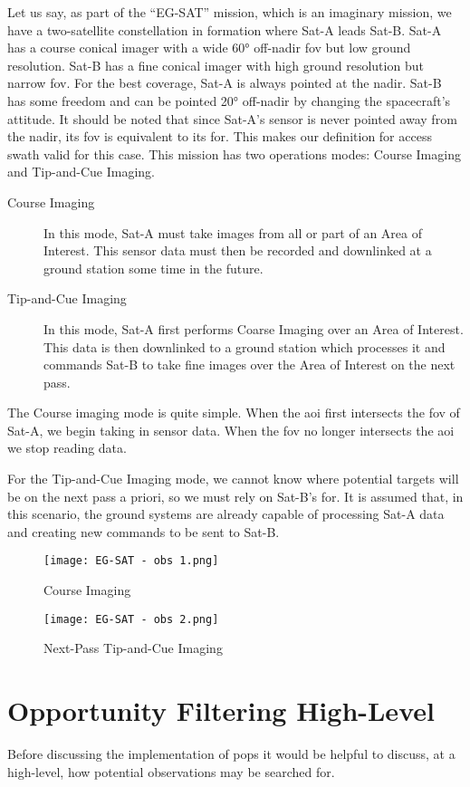 Let us say, as part of the “EG-SAT” mission, which is an imaginary mission, we
have a two-satellite constellation in formation where Sat-A leads Sat-B. Sat-A
has a course conical imager with a wide 60° off-nadir \gls{fov} but low ground
resolution.  Sat-B has a fine conical imager with high ground resolution but
narrow \gls{fov}.  For the best coverage, Sat-A is always pointed at the nadir.
Sat-B has some freedom and can be pointed 20° off-nadir by changing the
spacecraft’s attitude.  It should be noted that since Sat-A’s sensor is never
pointed away from the nadir, its \gls{fov} is equivalent to its \gls{for}. This
makes our definition for access swath valid for this case. This mission has two
operations modes: Course Imaging and Tip-and-Cue Imaging.

\begin{description} 

    \item[Course Imaging] In this mode, Sat-A must take images from all or part
	of an Area of Interest. This sensor data must then be recorded and
	downlinked at a ground station some time in the future.

    \item[Tip-and-Cue Imaging] In this mode, Sat-A first performs Coarse
	Imaging over an Area of Interest. This data is then downlinked to a
	ground station which processes it and commands Sat-B to take fine
	images over the Area of Interest on the next pass.

\end{description}

The Course imaging mode is quite simple. When the \gls{aoi} first intersects
the \gls{fov} of Sat-A, we begin taking in sensor data. When the \gls{fov} no
longer intersects the \gls{aoi} we stop reading data.

For the Tip-and-Cue Imaging mode, we cannot know where potential targets will
be on the next pass a priori, so we must rely on Sat-B's \gls{for}. It is
assumed that, in this scenario, the ground systems are already capable of
processing Sat-A data and creating new commands to be sent to Sat-B. 


\begin{figure} 
    \centering
    \begin{minipage}[c]{0.45\textwidth}
	\centering
	\texttt{[image: EG-SAT - obs 1.png]} 
	\caption{Course Imaging}
	\label{fig:eg-sat-2} 
    \end{minipage}
    \hfill
    \begin{minipage}[c]{0.45\textwidth}
	\centering
	\texttt{[image: EG-SAT - obs 2.png]} 
	\caption{Next-Pass Tip-and-Cue Imaging}
	\label{fig:eg-sat-3} 
    \end{minipage} 
\end{figure}


\section{Opportunity Filtering High-Level}

Before discussing the implementation of \gls{pops} it would be helpful to
discuss, at a high-level, how potential observations may be searched for. 

